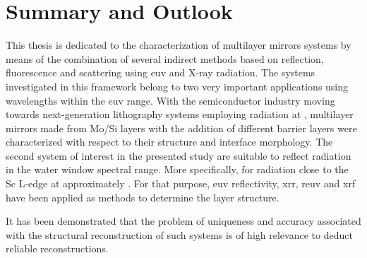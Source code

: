 \chapter{Summary and Outlook} \label{ch_summary}
This thesis is dedicated to the characterization of multilayer mirrors systems by means of the combination of several indirect methods based on reflection, fluorescence and scattering using \gls{euv} and X-ray radiation. The systems investigated in this framework belong to two very important applications using wavelengths within the \gls{euv} range. With the semiconductor industry moving towards next-generation lithography systems employing radiation at , multilayer mirrors made from Mo/Si layers with the addition of different barrier layers were characterized with respect to their structure and interface morphology. The second system of interest in the presented study are suitable to reflect radiation in the water window spectral range. More specifically, for radiation close to the Sc L-edge at approximately . For that purpose, \gls{euv} reflectivity, \gls{xrr}, \gls{reuv} and \gls{xrf} have been applied as methods to determine the layer structure.

It has been demonstrated that the problem of uniqueness and accuracy associated with the structural reconstruction of such systems is of high relevance to deduct reliable reconstructions.